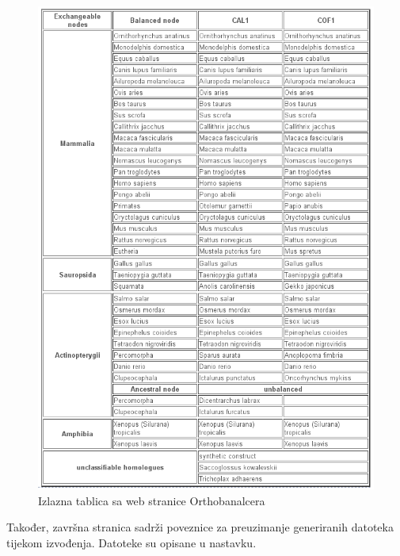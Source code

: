 \begin{figure}[h!]
\centering
\includegraphics[width=4.75in]{figures/tablica.png}
\caption{Izlazna tablica sa web stranice Orthobanalcera}
\label{fig:tablica}
\end{figure}

Također, završna stranica sadrži poveznice za preuzimanje generiranih datoteka
tijekom izvođenja. Datoteke su opisane u nastavku.
